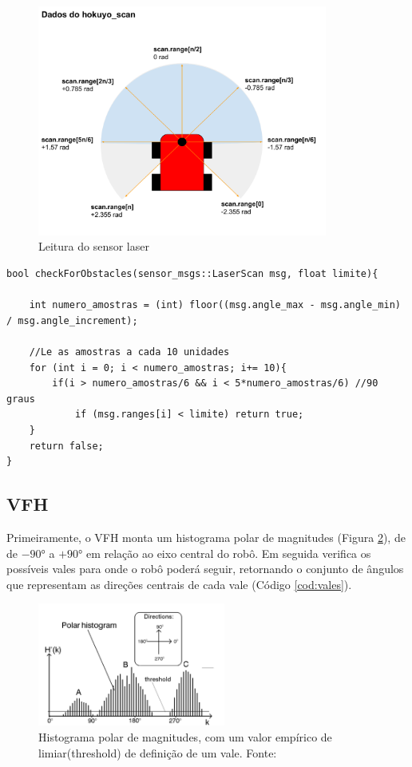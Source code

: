 \begin{figure}[H]
    \centering
    \includegraphics[width=0.85\textwidth]{img/SensorAngulos.pdf}
    \caption{Leitura do sensor laser}
    \label{fig:laser_scan}
\end{figure}

\begin{lstlisting}[frame=single, label=cod:checkObstacles, style=customc,
caption={Algoritmo de Verificação de Obstáculos}]
bool checkForObstacles(sensor_msgs::LaserScan msg, float limite){
    
    int numero_amostras = (int) floor((msg.angle_max - msg.angle_min) / msg.angle_increment);
    
    //Le as amostras a cada 10 unidades
    for (int i = 0; i < numero_amostras; i+= 10){
        if(i > numero_amostras/6 && i < 5*numero_amostras/6) //90 graus
            if (msg.ranges[i] < limite) return true;
    }
    return false;
}
\end{lstlisting}


\subsection{VFH}

Primeiramente, o VFH monta um histograma polar de magnitudes (Figura
\ref{fig:polar_hist}), de de $-90°$ a $+90°$ em relação ao eixo central do
robô. Em seguida verifica os possíveis vales para onde o robô poderá
seguir, retornando o conjunto de ângulos que representam as direções
centrais de cada vale (Código \ref{cod:vales}).

\begin{figure}[H]
    \centering
    \includegraphics[width=0.55\textwidth]{img/polar_histogram}
    \caption{Histograma polar de magnitudes, com um valor empírico de
      limiar(threshold) de definição de um vale. Fonte: \cite{c1}}
    \label{fig:polar_hist}
\end{figure}

